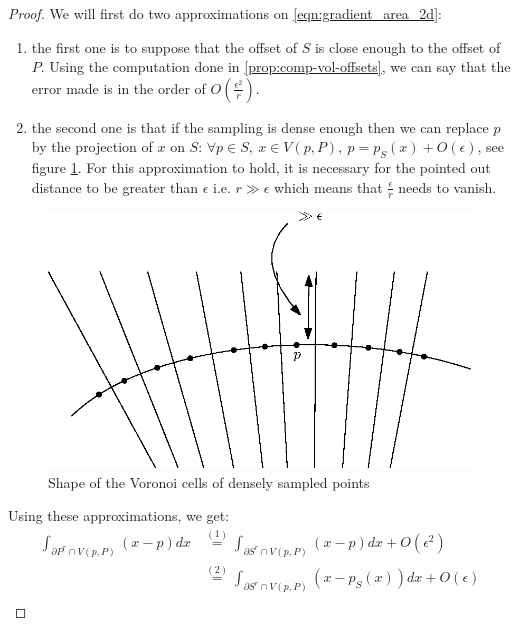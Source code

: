 \begin{proof}
We will first do two approximations on \ref{eqn:gradient_area_2d}:
\begin{enumerate}
    \item the first one is to suppose that the offset of $ S $ is close enough
        to the offset of $ P $. Using the computation done in
        \ref{prop:comp-vol-offsets}, we can say that the error made is in the
        order of $ O(\frac{\epsilon^2}{r}) $.
    \item the second one is that if the sampling is dense enough then we can
        replace $ p $ by the projection of $ x $ on $ S $: $ \forall p \in S,~x
        \in V(p, P),~p = p_S(x) + O(\epsilon) $, see figure
        \ref{fig:voronoi-cylinder}.  For this approximation to hold, it is
        necessary for the pointed out distance to be greater than $ \epsilon $
        i.e. $ r \gg \epsilon $ which means that $ \frac{\epsilon}{r} $ needs to
        vanish.
\end{enumerate}

\begin{figure}[h]
    \centering
    \includegraphics[scale=0.5]{img/voronoi-cylinder}
    \caption{Shape of the Voronoi cells of densely sampled points}
    \label{fig:voronoi-cylinder}
\end{figure}

Using these approximations, we get:
\begin{align*}
    \int_{\partial{P^r} \cap V(p, P)} (x - p) dx & \stackrel{(1)}{=} \int_{\partial{S^r} \cap V(p,
        P)} (x - p) dx + O(\epsilon^2) \\
    &\stackrel{(2)}{=} \int_{\partial{S^r} \cap V(p, P)} (x - p_S(x)) dx +
    O(\epsilon) \\
\end{align*}


\end{proof}
